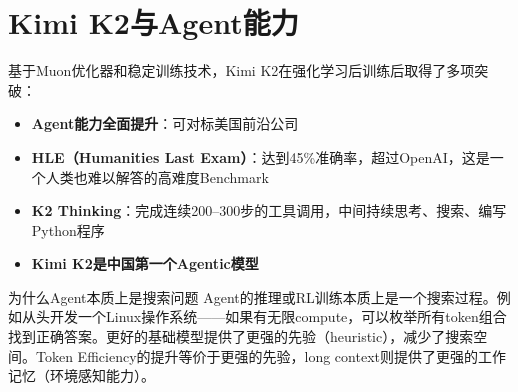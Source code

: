 \section{Kimi K2与Agent能力}

基于Muon优化器和稳定训练技术，Kimi K2在强化学习后训练后取得了多项突破：

\begin{itemize}
\item \textbf{Agent能力全面提升}：可对标美国前沿公司
\item \textbf{HLE（Humanities Last Exam）}：达到45\%准确率，超过OpenAI，这是一个人类也难以解答的高难度Benchmark
\item \textbf{K2 Thinking}：完成连续200--300步的工具调用，中间持续思考、搜索、编写Python程序
\item \textbf{Kimi K2是中国第一个Agentic模型}
\end{itemize}

\begin{knowledgebox}{为什么Agent本质上是搜索问题}
Agent的推理或RL训练本质上是一个搜索过程。例如从头开发一个Linux操作系统——如果有无限compute，可以枚举所有token组合找到正确答案。更好的基础模型提供了更强的先验（heuristic），减少了搜索空间。Token Efficiency的提升等价于更强的先验，long context则提供了更强的工作记忆（环境感知能力）。
\end{knowledgebox}


